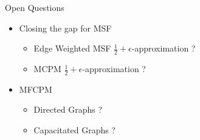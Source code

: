 \begin{frame}{Open Questions}
\begin{itemize}[<+->]
  \item Closing the gap for MSF   
	\begin{itemize}[<+->]
	  \item Edge Weighted MSF $\frac{1}{2} + \epsilon$-approximation ?
	  \item MCPM $\frac{1}{2} + \epsilon$-approximation ?
	\end{itemize}
  \item MFCPM  
	\begin{itemize}[<+->]
	  \item Directed Graphs ?
	  \item Capacitated Graphs ?
	\end{itemize}
\end{itemize}
\end{frame}